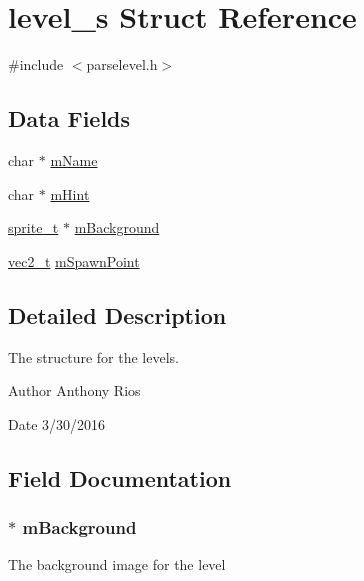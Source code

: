 \hypertarget{structlevel__s}{}\section{level\+\_\+s Struct Reference}
\label{structlevel__s}


{\ttfamily \#include $<$parselevel.\+h$>$}

\subsection*{Data Fields}
\begin{DoxyCompactItemize}
\item 
char $\ast$ \hyperlink{structlevel__s_ad5201d7f075979ee60c684961d6a4ead}{m\+Name}
\item 
char $\ast$ \hyperlink{structlevel__s_a3353a10b7f238b4dc36fc1ccad58cd45}{m\+Hint}
\item 
\hyperlink{graphics_8h_a5371414b10358aeda7c6bcec8196342f}{sprite\+\_\+t} $\ast$ \hyperlink{structlevel__s_ab2cdfd66047e062b1da2948d07f9f90d}{m\+Background}
\item 
\hyperlink{globals_8h_a773f2054819bb6014f1e50baa39cb5e3}{vec2\+\_\+t} \hyperlink{structlevel__s_aa7fb9f569bb3df8b37853ebc7e67b11c}{m\+Spawn\+Point}
\end{DoxyCompactItemize}


\subsection{Detailed Description}
The structure for the levels.

\begin{DoxyAuthor}{Author}
Anthony Rios 
\end{DoxyAuthor}
\begin{DoxyDate}{Date}
3/30/2016 
\end{DoxyDate}


\subsection{Field Documentation}
\subsubsection[{\texorpdfstring{m\+Background}{mBackground}}]{$\ast$ m\+Background}\hypertarget{structlevel__s_ab2cdfd66047e062b1da2948d07f9f90d}{}\label{structlevel__s_ab2cdfd66047e062b1da2948d07f9f90d}
The background image for the level 
